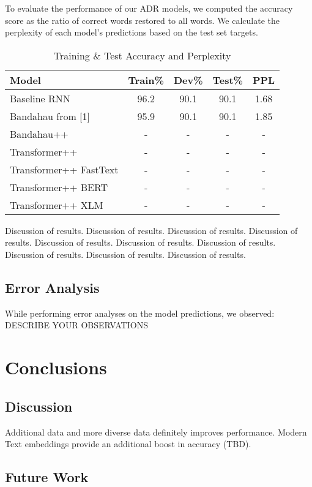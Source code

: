 \documentclass{article} %
\begin{document}
To evaluate the performance of our ADR models, we computed the accuracy score as the ratio of correct words restored to all words. We calculate the perplexity of each model's predictions based on the test set targets.
 \begin{table}[h]
  \caption{Training \& Test Accuracy and Perplexity}
  \label{tab:results}
  \centering
  \begin{tabular}{lcccc}
    \toprule
    \textbf{Model} & \textbf{Train\%} & \textbf{Dev\%} & \textbf{Test\%} &\textbf{PPL} \\
    \midrule
    Baseline RNN & 96.2 & 90.1 & 90.1 & 1.68 \\
    Bandahau from [1] & 95.9 & 90.1 & 90.1 & 1.85 \\
    \midrule
	Bandahau++ & - & - & - & - \\ 
	Transformer++ & - & - & - & - \\ 
	\midrule
	Transformer++ FastText & - & - & - & - \\ 
	Transformer++ BERT & - & - & - & - \\ 
	Transformer++ XLM & - & - & - & - \\ 

    \bottomrule
  \end{tabular}
\end{table}
Discussion of results. Discussion of results. Discussion of results. Discussion of results. Discussion of results. Discussion of results. Discussion of results. Discussion of results. Discussion of results. Discussion of results. 

\subsection{Error Analysis}
While performing error analyses on the model predictions, we observed: DESCRIBE YOUR OBSERVATIONS

\section{Conclusions}


\subsection{Discussion} %
Additional data and more diverse data definitely improves performance. Modern Text embeddings provide an additional boost in accuracy (TBD).


\subsection{Future Work}
\end{document}

